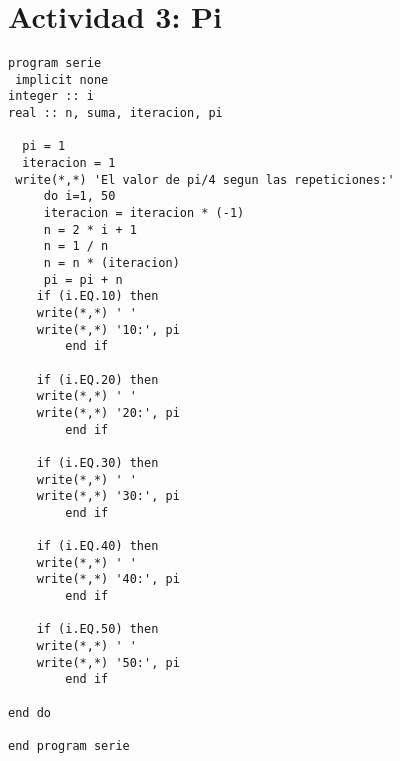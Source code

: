 \documentclass{article}
\begin{document}
\section{Actividad 3: Pi}
\begin{verbatim}
program serie
 implicit none
integer :: i
real :: n, suma, iteracion, pi

  pi = 1
  iteracion = 1
 write(*,*) 'El valor de pi/4 segun las repeticiones:'
     do i=1, 50
     iteracion = iteracion * (-1)
     n = 2 * i + 1
     n = 1 / n
     n = n * (iteracion)
     pi = pi + n
	if (i.EQ.10) then
	write(*,*) ' '
	write(*,*) '10:', pi
        end if

	if (i.EQ.20) then
	write(*,*) ' '
	write(*,*) '20:', pi
        end if

	if (i.EQ.30) then
	write(*,*) ' '
	write(*,*) '30:', pi
        end if

	if (i.EQ.40) then
	write(*,*) ' '
	write(*,*) '40:', pi
        end if

	if (i.EQ.50) then
	write(*,*) ' '
	write(*,*) '50:', pi
        end if

end do

end program serie

\end{verbatim}
\end{document}
